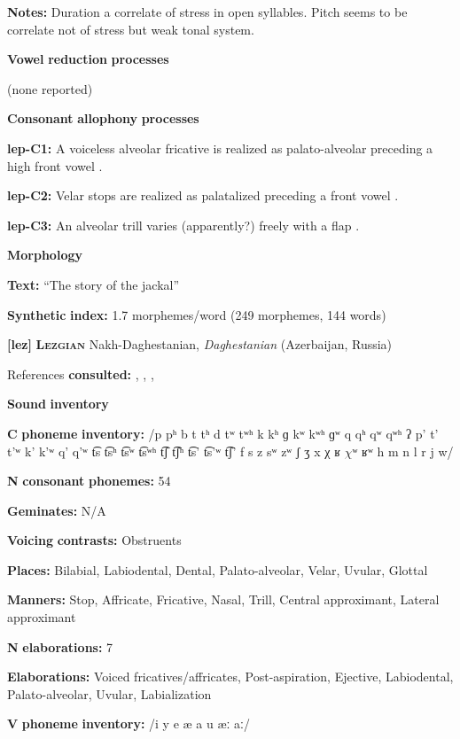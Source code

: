 \textbf{Notes:} Duration a correlate of stress in open syllables. Pitch seems to be correlate not of stress but weak tonal system.

\textbf{Vowel} \textbf{reduction} \textbf{processes}

(none reported)

\textbf{Consonant} \textbf{allophony} \textbf{processes}

\textbf{lep-C1:} A voiceless alveolar fricative is realized as palato-alveolar preceding a high front vowel \citep[27]{Plaisier2007}.

\textbf{lep-C2:} Velar stops are realized as palatalized preceding a front vowel \citep[21]{Plaisier2007}.

\textbf{lep-C3:} An alveolar trill varies (apparently?) freely with a flap \citep[28]{Plaisier2007}.

\textbf{Morphology}

\textbf{Text:} “The story of the jackal” \citep[165-168]{Plaisier2007}

\textbf{Synthetic} \textbf{index:} 1.7 morphemes/word (249 morphemes, 144 words)

\textbf{[lez]}   \textbf{\textsc{Lezgian}}  Nakh-Daghestanian, \textit{Daghestanian} (Azerbaijan, Russia)

References \textbf{consulted:} \citet{ChitoranBabaliyeva2007}, \citet{Haspelmath1993}, \citet{Kodzasov1990}, \citet{Yu2004}

\textbf{Sound} \textbf{inventory}

\textbf{C} \textbf{phoneme} \textbf{inventory:} /p pʰ b t tʰ d tʷ tʷʰ k kʰ ɡ kʷ kʷʰ ɡʷ q qʰ qʷ qʷʰ ʔ p’ t’ t’ʷ k’ k’ʷ q’ q’ʷ t͡s t͡sʰ t͡sʷ t͡sʷʰ t͡ʃ t͡ʃʰ t͡s’ t͡s’ʷ t͡ʃ’ f s z sʷ zʷ ʃ ʒ x χ ʁ $\chi ʷ$ ʁʷ h m n l r j w/

\textbf{N} \textbf{consonant} \textbf{phonemes:} 54

\textbf{Geminates:} N/A

\textbf{Voicing} \textbf{contrasts:} Obstruents

\textbf{Places:} Bilabial, Labiodental, Dental, Palato-alveolar, Velar, Uvular, Glottal

\textbf{Manners:} Stop, Affricate, Fricative, Nasal, Trill, Central approximant, Lateral approximant

\textbf{N} \textbf{elaborations:} 7

\textbf{Elaborations:} Voiced fricatives/affricates, Post-aspiration, Ejective, Labiodental, Palato-alveolar, Uvular, Labialization

\textbf{V} \textbf{phoneme} \textbf{inventory:} /i y e æ a u æː aː/

